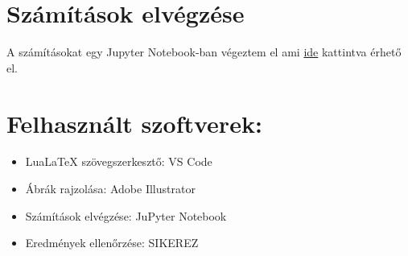 \documentclass[12pt,a4paper]{article}
\begin{document}
\vfill

\section*{Számítások elvégzése}
A számításokat egy Jupyter Notebook-ban végeztem el ami
\href{https://github.com/near731/VEM_HF2_Python/blob/main/vem_hf2.ipynb}{ide} kattintva érhető el.

\section*{Felhasznált szoftverek:}
\begin{itemize}
    \item Lua\LaTeX \hspace{0.4mm} szövegszerkesztő: VS Code
    \item Ábrák rajzolása: Adobe Illustrator
    \item Számítások elvégzése: JuPyter Notebook
    \item Eredmények ellenőrzése: SIKEREZ
\end{itemize}

\newpage
\tableofcontents
\end{document}
